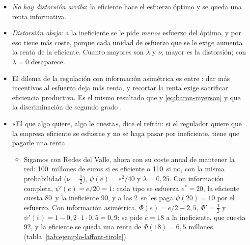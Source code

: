 \documentclass[11pt]{article}
\begin{document}
\begin{itemize}
\item \emph{No hay distorsión arriba}: la eficiente hace el esfuerzo óptimo y se queda una renta informativa.
\item \emph{Distorsión abajo}: a la ineficiente se le pide \emph{menos} esfuerzo del óptimo, y por eso tiene más coste, porque cada unidad de esfuerzo que se le exige aumenta la renta de la eficiente. Cuanto mayores son $\lambda$ y $\nu$, mayor es la distorsión; con $\lambda=0$ desaparece.
\item El dilema de la regulación con información asimétrica es entre : dar más incentivos al esfuerzo deja más renta, y recortar la renta exige sacrificar eficiencia productiva. Es el mismo resultado que  y  \eqref{eq:baron-myerson} y que la discriminación de segundo grado .
\item «El que algo quiere, algo le cuesta», dice el refrán: si el regulador quiere que la empresa eficiente se esfuerce y no se haga pasar por ineficiente, tiene que pagarle una renta.
  \begin{itemize}
  \item Sigamos con Redes del Valle, ahora con su coste anual de mantener la red: 100~millones de euros si es eficiente o 110~si no, con la misma probabilidad ($\nu=\tfrac12$), $\psi(e)=e^2/40$ y $\lambda=0{,}25$. Con información completa, $\psi'(e)=e/20=1$: cada tipo se esfuerza $e^{*}=20$, la eficiente cuesta 80~y la ineficiente 90, y a las 2~se les paga $\psi(20)=10$ por el esfuerzo. Con información asimétrica, $\Phi(e)=e/2-2{,}5$, $\Phi'=\tfrac12$ y $\psi'(\overline{e})=1-0{,}2\cdot1\cdot0{,}5=0{,}9$: se pide $\overline{e}=18$ a la ineficiente, que cuesta 92, y la eficiente se queda una renta de $\Phi(18)=6{,}5$ millones (tabla~\ref{tab:ejemplo-laffont-tirole}).
  \end{itemize}
\end{itemize}
\end{document}
